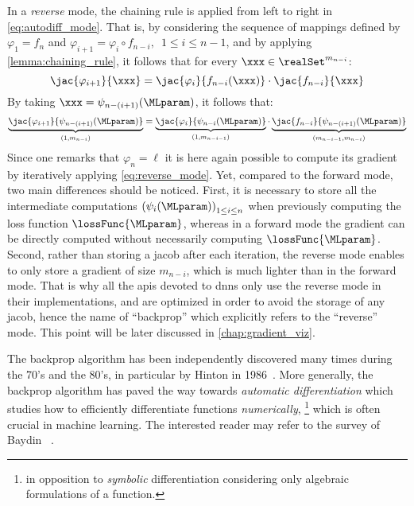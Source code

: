 In a \emph{reverse} mode, the chaining rule is applied from left to right in \autoref{eq:autodiff_mode}.
That is, by considering the sequence of mappings defined by \(\varphi_1 = f_n\) and \(\varphi_{i+1} = \varphi_i \circ f_{n-i}, \enspace 1 \leq i \leq n-1\), and by applying \autoref{lemma:chaining_rule}, it follows that for every \(\xxx \in \realSet^{m_{n-i}}\):
\begin{equation}
	\jac{\varphi_{i+1}}{\xxx} = 
	\jac{\varphi_i}{f_{n-i}(\xxx)} \cdot 
	\jac{f_{n-i}}{\xxx}
\end{equation}
By taking \(\xxx = \psi_{n-(i+1)}(\MLparam)\), it follows that:
\begin{equation}
	\underbrace{\jac{\varphi_{i+1}}{\psi_{n-(i+1)}(\MLparam)}}_{(1, m_{n-i})} = 
	\underbrace{\jac{\varphi_i}{\psi_{n-i}(\MLparam)}}_{(1, m_{n-i-1})} \cdot 
	\underbrace{\jac{f_{n-i}}{\psi_{n-(i+1)}(\MLparam)}}_{(m_{n-i-1}, m_{n-i})}
	\label{eq:reverse_mode}
\end{equation}
Since one remarks that \(\varphi_n = \ell\) it is here again possible to compute its gradient by iteratively applying \autoref{eq:reverse_mode}.
Yet, compared to the forward mode, two main differences should be noticed.
First, it is necessary to store all the intermediate computations \(\left(\psi_i(\MLparam)\right)_{1 \leq i \leq n}\) when previously computing the loss function \(\lossFunc{\MLparam}\), whereas in a forward mode the gradient can be directly computed without necessarily computing \(\lossFunc{\MLparam}\).
Second, rather than storing a \gls{jacob} after each iteration, the reverse mode enables to only store a gradient of size \(m_{n-i}\), which is much lighter than in the forward mode.
That is why all the \glspl{api} devoted to \glspl{dnn} only use the reverse mode in their implementations, and are optimized in order to avoid the storage of any \gls{jacob}, hence the name of ``backprop'' which explicitly refers to the ``reverse'' mode.
This point will be later discussed in \autoref{chap:gradient_viz}.

The backprop algorithm has been independently discovered many times during the 70's and the 80's, in particular by Hinton \etal{} in 1986~\cite{rumelhart_learning_1986,hinton_backprop_1986}.
More generally, the backprop algorithm has paved the way towards \emph{automatic differentiation} which studies how to efficiently differentiate functions \emph{numerically},%
\footnote{
	\ie{} in opposition to \emph{symbolic} differentiation considering only algebraic formulations of a function.
} 
which is often crucial in machine learning.
The interested reader may refer to the survey of Baydin \etal{}~\cite{baydin_automatic_2017}.

